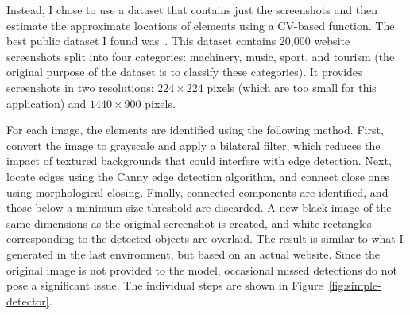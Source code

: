 \documentclass[
  digital,     %
  oneside,     %
  nosansbold,  %
  nocolorbold, %
  lof,         %
  lot,         %
]{fithesis4}
\begin{document}
Instead, I chose to use a dataset that contains just the screenshots and then estimate the approximate locations of elements using a CV-based function. The best public dataset I found was~\cite{aydos2020}. This dataset contains 20,000 website screenshots split into four categories: machinery, music, sport, and tourism (the original purpose of the dataset is to classify these categories). It provides screenshots in two resolutions: $224\times224$ pixels (which are too small for this application) and $1440\times900$ pixels.

For each image, the elements are identified using the following method. First, convert the image to grayscale and apply a bilateral filter, which reduces the impact of textured backgrounds that could interfere with edge detection. Next, locate edges using the Canny edge detection algorithm, and connect close ones using morphological closing. Finally, connected components are identified, and those below a minimum size threshold are discarded. A new black image of the same dimensions as the original screenshot is created, and white rectangles corresponding to the detected objects are overlaid. The result is similar to what I generated in the last environment, but based on an actual website. Since the original image is not provided to the model, occasional missed detections do not pose a significant issue. The individual steps are shown in Figure~\ref{fig:simple-detector}.
\end{document}
